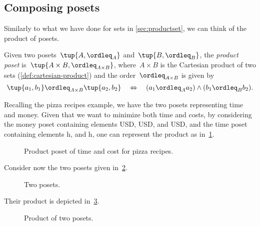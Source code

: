 \subsection{Composing posets}
Similarly to what we have done for sets in \cref{sec:productset}, we can think of the product of posets.

\begin{definition}
\label{def:productposet}
Given two posets~$\tup{A, \ordleq_A}$
and~$\tup{B, \ordleq_B}$, the \emph{product poset} is~$\tup{A \times B, \ordleq_{A\times B}}$, where~$A \times B$ is the Cartesian product of two sets (\cref{def:cartesian-product}) and the order~$\ordleq_{A\times B}$ is given by
\begin{equation}
        \tup{a_1, b_1}
        \ordleq_{A\times B}
        \tup{a_2, b_2}
        \quad
        \Leftrightarrow
        \quad
        (a_1 \ordleq_A a_2) \wedge
        (b_1 \ordleq_B b_2).
    \end{equation}
\end{definition}
Recalling the pizza recipes example, we have the two posets representing time and money. Given that we want to minimize both time and costs, by considering the money poset containing elements \unit[1]{USD}, \unit[2]{USD}, and \unit[3]{USD}, and the time poset containing elements \unit[1]{h}, and \unit[2]{h}, one can represent the product as in~\cref{fig:productpizza}.

\begin{figure}[h!]
\begin{center}
\end{center}
\caption{Product poset of time and cost for pizza recipes.\label{fig:productpizza}}
\end{figure}


\begin{example}
Consider now the two posets given in~\cref{fig:composing_posets_1}.
\begin{figure}[h!]
\begin{center}
\end{center}
\caption{Two posets. \label{fig:composing_posets_1}}
\end{figure}
Their product is depicted in~\cref{fig:composing_posets_2}.
\begin{figure}[h!]
\begin{center}
\end{center}
\caption{Product of two posets. \label{fig:composing_posets_2}}
\end{figure}
\end{example}

